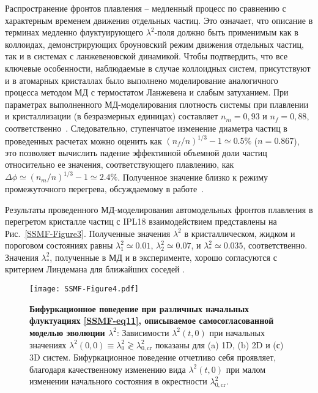 Распространение фронтов плавления -- медленный процесс по сравнению с характерным временем движения отдельных частиц.
Это означает, что описание в терминах медленно флуктуирующего $\lambda^2$-поля должно быть применимым как в коллоидах, демонстрирующих броуновский режим движения отдельных частиц, так и в системах с ланжевеновской динамикой.
Чтобы подтвердить, что все ключевые особенности, наблюдаемые в случае коллоидных систем, присутствуют и в атомарных кристаллах было выполнено моделирование аналогичного процесса методом МД с термостатом Ланжевена и слабым затуханием.
При параметрах выполненного МД-моделирования плотность системы при плавлении и кристаллизации (в безразмерных единицах) составляет $ n_m = 0,93 $ и $ n_f = 0,88 $, соответственно~\cite{10.1080/00268979500100911}.
Следовательно, ступенчатое изменение диаметра частиц в проведенных расчетах можно оценить как $ (n_f / n) ^ {1/3} -1 \simeq 0.5 \% $ ($ n = 0.867 $), это позволяет вычислить падение эффективной объемной доли частиц относительно ее значения, соответствующего плавлению, как
$\Delta \phi  \simeq (n_m/n)^{1/3}-1\simeq 2.4\%$.
Полученное значение близко к режиму промежуточного перегрева, обсуждаемому в работе~\cite{10.1038/ncomms7942}.

Результаты проведенного МД-моделирования автомодельных фронтов плавления в перегретом кристалле частиц с IPL18 взаимодействием представлены на Рис.~\ref{SSMF-Figure3}.
Полученные значения $\lambda^2$ в кристаллическом, жидком и пороговом состояниях равны $\lambda_1^2 \simeq 0.01$, $\lambda_2^2 \simeq 0.07$, и $\lambda_\ast^2 \simeq 0.035$, соответственно.
Значения $\lambda_\ast^2$, полученные в МД и в эксперименте, хорошо согласуются с критерием Линдемана для ближайших соседей \cite{10.1016/0375-9601(85)90617-6}.


\begin{figure}[!t]
\centering
 \texttt{[image: SSMF-Figure4.pdf]}
 \caption{\textbf{Бифуркационное поведение при различных начальных флуктуациях \eqref {SSMF-eq11}, описываемое самосогласованной моделью эволюции $\lambda^2$}:
 Зависимости $\lambda^2(t, 0)$ при начальных значениях $ \lambda^2(0,0)\equiv\lambda_0 ^2\gtrless\lambda_{0,\mathrm {cr}}^2$ показаны для (a) 1D, (b) 2D и (с) 3D систем. Бифуркационное поведение отчетливо себя проявляет, благодаря качественному изменению вида $\lambda ^ 2(t,0)$ при малом изменении начального состояния в окрестности $\lambda_ {0,\mathrm{cr}}^2$.}
\label{SSMF-Figure4}
\end{figure}



